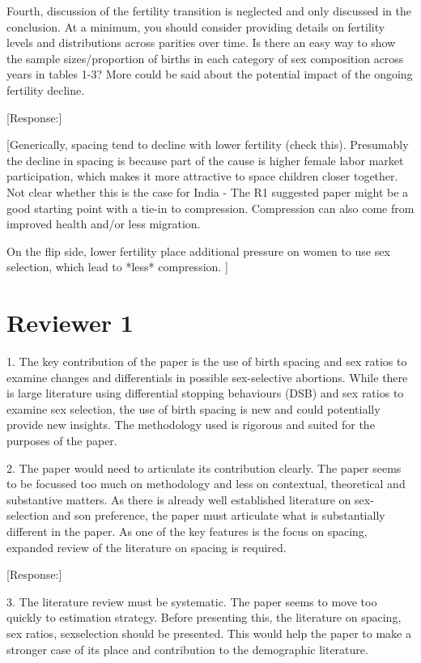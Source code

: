 \documentclass[letterpaper,12pt]{article}
\begin{document}
Fourth, discussion of the fertility transition is neglected and only
discussed in the conclusion. At a minimum, you should consider providing
details on fertility levels and distributions across parities over time.
Is there an easy way to show the sample sizes/proportion of births in
each category of sex composition across years in tables 1-3? More could
be said about the potential impact of the ongoing fertility decline.

[Response:]




[Generically, spacing tend to decline with lower fertility (check this). 
Presumably the decline in spacing is because part of the cause is higher female labor 
market participation, which makes it more attractive to space children closer together.
Not clear whether this is the case for India - The R1 suggested paper might be a good
starting point with a tie-in to compression.
Compression can also come from improved health and/or less migration.

On the flip side, lower fertility place additional pressure on women to use
sex selection, which lead to *less* compression.
]

\newpage

\section*{Reviewer 1}


1. The key contribution of the paper is the use of birth spacing and sex
ratios to examine changes and differentials in possible sex-selective
abortions. While there is large literature using differential stopping
behaviours (DSB) and sex ratios to examine sex selection, the use of
birth spacing is new and could potentially provide new insights. The
methodology used is rigorous and suited for the purposes of the paper.

2. The paper would need to articulate its contribution clearly. The
paper seems to be focussed too much on methodology and less on
contextual, theoretical and substantive matters. As there is already
well established literature on sex-selection and son preference, the
paper must articulate what is substantially different in the paper. As
one of the key features is the focus on spacing, expanded review of the
literature on spacing is required.

[Response:]


3. The literature review must be systematic. The paper seems to move too
quickly to estimation strategy. Before presenting this, the literature
on spacing, sex ratios, sexselection should be presented. This would
help the paper to make a stronger case of its place and contribution to
the demographic literature.
\end{document}
